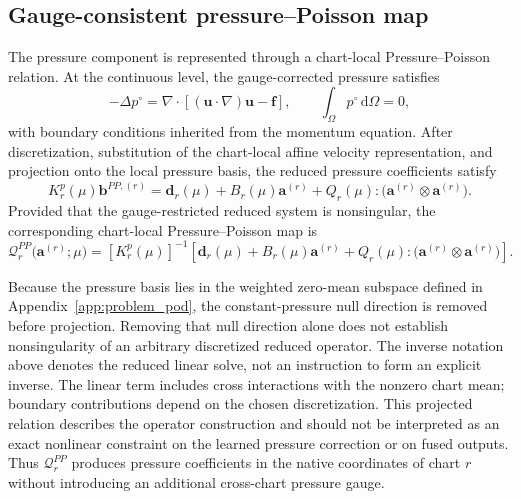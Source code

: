 \subsection{Gauge-consistent pressure--Poisson map}

The pressure component is represented through a chart-local
Pressure--Poisson relation.
At the continuous level, the gauge-corrected pressure satisfies
\begin{equation}
    -\Delta p^\circ
    =
    \nabla\!\cdot
    \left[
        (\bm u\!\cdot\!\nabla)\bm u
        -
        \bm f
    \right],
    \qquad
    \int_\Omega p^\circ\,\mathrm d\Omega=0,
    \label{eq:app_continuous_pressure_poisson}
\end{equation}
with boundary conditions inherited from the momentum equation.
After discretization, substitution of the chart-local affine velocity
representation, and projection onto the local pressure basis, the reduced
pressure coefficients satisfy
\begin{equation}
    K_r^p(\mu)\bm b^{PP,(r)}
    =
    \bm d_r(\mu)
    +
    B_r(\mu)\bm a^{(r)}
    +
    Q_r(\mu):
    \bigl(
        \bm a^{(r)}\otimes\bm a^{(r)}
    \bigr).
    \label{eq:app_pressure_poisson_system}
\end{equation}
Provided that the gauge-restricted reduced system is nonsingular, the corresponding chart-local Pressure--Poisson map is
\begin{equation}
    \mathcal Q_r^{PP}
    \bigl(
        \bm a^{(r)};
        \mu
    \bigr)
    =
    [K_r^p(\mu)]^{-1}
    \left[
        \bm d_r(\mu)
        +
        B_r(\mu)\bm a^{(r)}
        +
        Q_r(\mu):
        \bigl(
            \bm a^{(r)}\otimes\bm a^{(r)}
        \bigr)
    \right].
    \label{eq:app_pressure_poisson_map}
\end{equation}

Because the pressure basis lies in the weighted zero-mean subspace defined in
Appendix~\ref{app:problem_pod}, the constant-pressure null direction is
removed before projection. Removing that null direction alone does not establish nonsingularity of an arbitrary discretized reduced operator. The inverse notation above denotes the reduced linear solve, not an instruction to form an explicit inverse. The linear term includes cross interactions with the nonzero chart mean; boundary contributions depend on the chosen discretization. This projected relation describes the operator construction and should not be interpreted as an exact nonlinear constraint on the learned pressure correction or on fused outputs.
Thus $\mathcal Q_r^{PP}$ produces pressure coefficients in the native
coordinates of chart $r$ without introducing an additional cross-chart
pressure gauge.

